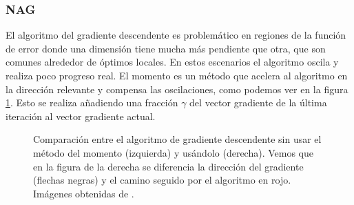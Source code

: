 \subsubsection{NAG}

El algoritmo del gradiente descendente es problemático en regiones de la función de error donde una dimensión tiene mucha más pendiente que otra, que son comunes alrededor de óptimos locales. En estos escenarios el algoritmo oscila y realiza poco progreso real. El momento \cite{momentumorig} es un método que acelera al algoritmo en la dirección relevante y compensa las oscilaciones, como podemos ver en la figura \ref{fig:momentum}. Esto se realiza añadiendo una fracción $\gamma$ del vector gradiente de la última iteración al vector gradiente actual.

\begin{figure}[!tbp]

  \centering
  \hfill
  \caption{Comparación entre el algoritmo de gradiente descendente sin usar el método del momento (izquierda) y usándolo (derecha). Vemos que en la figura de la derecha se diferencia la dirección del gradiente (flechas negras) y el camino seguido por el algoritmo en rojo. Imágenes obtenidas de \cite{GoodFellowBook}.}
    \label{fig:momentum}
\end{figure}

